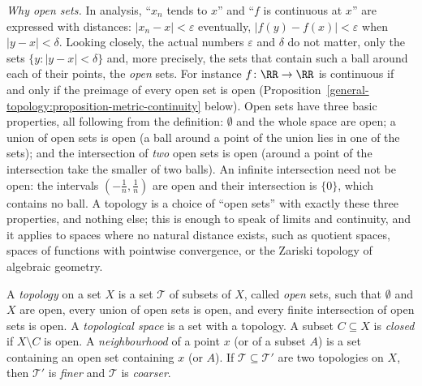 \emph{Why open sets.} In analysis, ``$x_n$ tends to $x$'' and ``$f$ is continuous at $x$'' are expressed with distances: $|x_n - x| < \varepsilon$ eventually, $|f(y) - f(x)| < \varepsilon$ when
$|y - x| < \delta$. Looking closely, the actual numbers $\varepsilon$ and $\delta$ do not matter, only the sets $\{y : |y - x| < \delta\}$ and, more precisely, the sets that contain such a ball around each of
their points, the \emph{open} sets. For instance $f \colon \RR \to \RR$ is continuous if and only if the preimage of every open set is open (Proposition~\ref{general-topology:proposition-metric-continuity}
below). Open sets have three basic properties, all following from the definition: $\emptyset$ and the whole space are open; a union of open sets is open (a ball around a point of the union lies in one of
the sets); and the intersection of \emph{two} open sets is open (around a point of the intersection take the smaller of two balls). An infinite intersection need not be open: the intervals
$(-\frac1n, \frac1n)$ are open and their intersection is $\{0\}$, which contains no ball. A topology is a choice of ``open sets'' with exactly these three properties, and nothing else; this is enough to
speak of limits and continuity, and it applies to spaces where no natural distance exists, such as quotient spaces, spaces of functions with pointwise convergence, or the Zariski topology of algebraic
geometry.

\begin{definition}\label{general-topology:definition-topology}
A \emph{topology} on a set $X$ is a set $\mathcal{T}$ of subsets of $X$, called \emph{open} sets, such that $\emptyset$ and $X$
are open, every union of open sets is open, and every finite intersection of open sets is open. A \emph{topological space}
is a set with a topology. A subset $C \subseteq X$ is \emph{closed} if $X \setminus C$ is open. A \emph{neighbourhood} of a point
$x$ (or of a subset $A$) is a set containing an open set containing $x$ (or $A$). If $\mathcal{T} \subseteq \mathcal{T}'$ are two
topologies on $X$, then $\mathcal{T}'$ is \emph{finer} and $\mathcal{T}$ is \emph{coarser}.
\end{definition}

